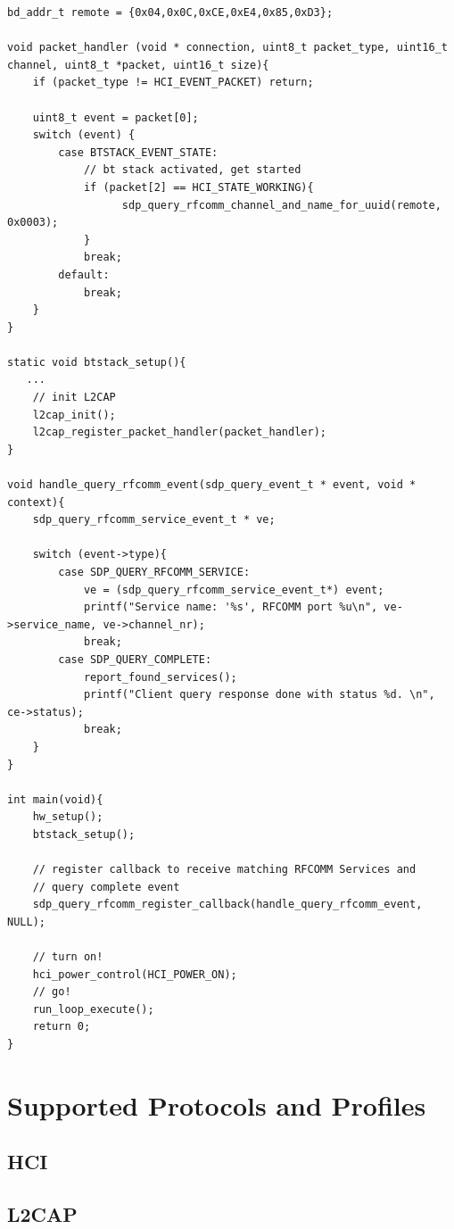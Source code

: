 \documentclass[a4paper,titlepage,oneside,12pt]{amsart} %
\begin{document}
\begin{lstlisting}[caption=Searching RFCOMM services on a remote device., label=SDPClientRFCOMM ]
bd_addr_t remote = {0x04,0x0C,0xCE,0xE4,0x85,0xD3};

void packet_handler (void * connection, uint8_t packet_type, uint16_t channel, uint8_t *packet, uint16_t size){
    if (packet_type != HCI_EVENT_PACKET) return;

    uint8_t event = packet[0];
    switch (event) {
        case BTSTACK_EVENT_STATE:
            // bt stack activated, get started 
            if (packet[2] == HCI_STATE_WORKING){
            	  sdp_query_rfcomm_channel_and_name_for_uuid(remote, 0x0003);
            }
            break;
        default:
            break;
    }
}

static void btstack_setup(){
   ...
    // init L2CAP
    l2cap_init();
    l2cap_register_packet_handler(packet_handler);
}

void handle_query_rfcomm_event(sdp_query_event_t * event, void * context){
    sdp_query_rfcomm_service_event_t * ve;
            
    switch (event->type){
        case SDP_QUERY_RFCOMM_SERVICE:
            ve = (sdp_query_rfcomm_service_event_t*) event;
            printf("Service name: '%s', RFCOMM port %u\n", ve->service_name, ve->channel_nr);
            break;
        case SDP_QUERY_COMPLETE:
            report_found_services();
            printf("Client query response done with status %d. \n", ce->status);
            break;
    }
}

int main(void){
    hw_setup();
    btstack_setup();
    
    // register callback to receive matching RFCOMM Services and 
    // query complete event 
    sdp_query_rfcomm_register_callback(handle_query_rfcomm_event, NULL);

    // turn on!
    hci_power_control(HCI_POWER_ON);
    // go!
    run_loop_execute(); 
    return 0;
}

\end{lstlisting}

\section{Supported Protocols and Profiles}
\subsection{HCI}
\subsection{L2CAP}
\end{document}
